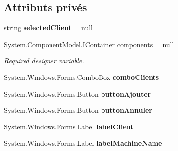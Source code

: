 \subsection*{Attributs privés}
\begin{DoxyCompactItemize}
\item 
\mbox{\label{class_m_t_connect_agent_1_1_form_ajout_machine_ab3a8b1ac438fedbb984634be306edc5c}} 
string {\bfseries selected\+Client} = null
\item 
System.\+Component\+Model.\+I\+Container \mbox{\hyperlink{class_m_t_connect_agent_1_1_form_ajout_machine_a52f1b57913f91bf6d032fe92c6dee576}{components}} = null
\begin{DoxyCompactList}\small\item\em Required designer variable. \end{DoxyCompactList}\item 
\mbox{\label{class_m_t_connect_agent_1_1_form_ajout_machine_aee77af459c269fba5431001f87ab33d3}} 
System.\+Windows.\+Forms.\+Combo\+Box {\bfseries combo\+Clients}
\item 
\mbox{\label{class_m_t_connect_agent_1_1_form_ajout_machine_a614ac1084888e4aa12b9a27dd006b920}} 
System.\+Windows.\+Forms.\+Button {\bfseries button\+Ajouter}
\item 
\mbox{\label{class_m_t_connect_agent_1_1_form_ajout_machine_a01604f1c9a9ab7a659ca54f5437b44ef}} 
System.\+Windows.\+Forms.\+Button {\bfseries button\+Annuler}
\item 
\mbox{\label{class_m_t_connect_agent_1_1_form_ajout_machine_ac1856bb9d697139f7b5a0fe585fefcef}} 
System.\+Windows.\+Forms.\+Label {\bfseries label\+Client}
\item 
\mbox{\label{class_m_t_connect_agent_1_1_form_ajout_machine_ae7aee960fbe99876ef433d50cc4c19e3}} 
System.\+Windows.\+Forms.\+Label {\bfseries label\+Machine\+Name}
\item 
\mbox{\label{class_m_t_connect_agent_1_1_form_ajout_machine_aef216554526b007b74247eee491113ff}} 

\end{DoxyCompactItemize}
